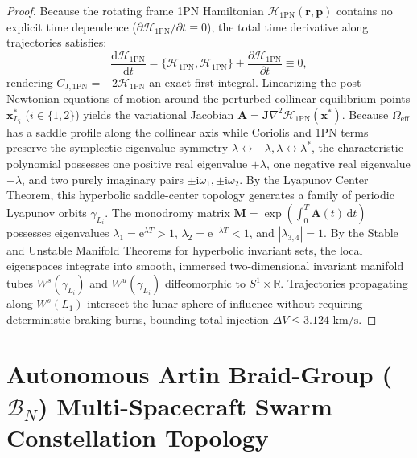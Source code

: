 \documentclass[11pt,a4paper,reqno]{article}
\theoremstyle{plain}
\theoremstyle{definition}
\theoremstyle{remark}
\numberwithin{equation}{section}
\providecommand{\diff}{\mathrm{d}}
\begin{document}
\begin{proof}
Because the rotating frame 1PN Hamiltonian $\mathcal{H}_{\mathrm{1PN}}(\bm{r}, \bm{p})$ contains no explicit time dependence ($\partial \mathcal{H}_{\mathrm{1PN}} / \partial t \equiv 0$), the total time derivative along trajectories satisfies:
\begin{equation}
  \frac{\diff \mathcal{H}_{\mathrm{1PN}}}{\diff t} = \{\mathcal{H}_{\mathrm{1PN}}, \mathcal{H}_{\mathrm{1PN}}\} + \frac{\partial \mathcal{H}_{\mathrm{1PN}}}{\partial t} \equiv 0,
\end{equation}
rendering $C_{\mathrm{J, 1PN}} = -2\mathcal{H}_{\mathrm{1PN}}$ an exact first integral. Linearizing the post-Newtonian equations of motion around the perturbed collinear equilibrium points $\bm{x}^*_{L_i}$ ($i \in \{1, 2\}$) yields the variational Jacobian $\mathbf{A} = \mathbf{J} \nabla^2 \mathcal{H}_{\mathrm{1PN}}(\bm{x}^*)$. Because $\Omega_{\mathrm{eff}}$ has a saddle profile along the collinear axis while Coriolis and 1PN terms preserve the symplectic eigenvalue symmetry $\lambda \leftrightarrow -\lambda, \lambda \leftrightarrow \lambda^*$, the characteristic polynomial possesses one positive real eigenvalue $+\lambda$, one negative real eigenvalue $-\lambda$, and two purely imaginary pairs $\pm \mathrm{i}\omega_1, \pm \mathrm{i}\omega_2$.
By the Lyapunov Center Theorem, this hyperbolic saddle-center topology generates a family of periodic Lyapunov orbits $\gamma_{L_i}$. The monodromy matrix $\mathbf{M} = \exp\left(\int_0^T \mathbf{A}(t)\,\diff t\right)$ possesses eigenvalues $\lambda_1 = \mathrm{e}^{\lambda T} > 1$, $\lambda_2 = \mathrm{e}^{-\lambda T} < 1$, and $|\lambda_{3,4}| = 1$. By the Stable and Unstable Manifold Theorems for hyperbolic invariant sets, the local eigenspaces integrate into smooth, immersed two-dimensional invariant manifold tubes $W^s(\gamma_{L_i})$ and $W^u(\gamma_{L_i})$ diffeomorphic to $S^1 \times \mathbb{R}$. Trajectories propagating along $W^s(L_1)$ intersect the lunar sphere of influence without requiring deterministic braking burns, bounding total injection $\Delta V \le 3.124\text{ km/s}$.
\end{proof}

\section{Autonomous Artin Braid-Group (\texorpdfstring{$\mathcal{B}_N$}{B N}) Multi-Spacecraft Swarm Constellation Topology}
\label{sec:artin_braid_swarm}
\end{document}
